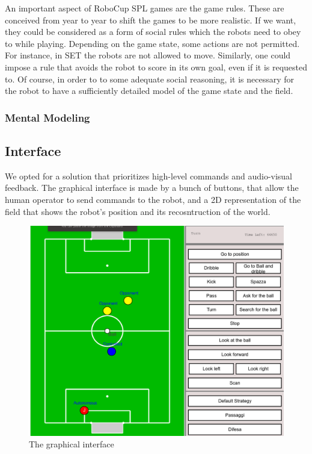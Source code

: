 \documentclass[a4paper, onecolumn, 12pt]{article}
\begin{document}
An important aspect of RoboCup SPL games are the game rules. These are conceived
from year to year to shift the games to be more realistic. If we want, they
could be considered as a form of social rules which the robots need to obey to
while playing. Depending on the game state, some actions are not permitted. For
instance, in SET the robots are not allowed to move. Similarly, one could impose
a rule that avoids the robot to score in its own goal, even if it is requested
to. Of course, in order to to some adequate social reasoning, it is necessary
for the robot to have a sufficiently detailed model of the game state and the
field.

\subsubsection{Mental Modeling}




\subsection{Interface}

We opted for a solution that prioritizes high-level commands and audio-visual
feedback. The graphical interface is made by a bunch of buttons, that allow the
human operator to send commands to the robot, and a 2D representation of the
field that shows the robot's position and its recosntruction of the world.  

\begin{figure}[H]
    \centering
    \includegraphics[width=0.9\linewidth]{assets/interface.png}
    \caption{The graphical interface}
    \label{fig:interface}
\end{figure}
\end{document}
